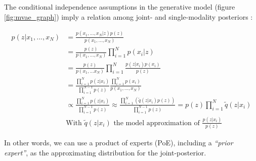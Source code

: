 \documentclass[12pt]{report}
\begin{document}
The conditional independence assumptions in the generative model (figure \ref{fig:mvae_graph}) imply a relation among joint- and single-modality posteriors :

\begin{equation}
    \begin{split}
        p(z|x_1, ..., x_N) & = \frac{p(x_1, ..., x_N | z) p(z)}{p(x_1, ..., x_N)} \\
        & = \frac{p(z)}{p(x_1, ..., x_N)} \prod_{i=1}^{N} p(x_i | z) \\
        & = \frac{p(z)}{p(x_1, ... x_N)} \prod_{i=1}^{N} \frac{p(z|x_i)p(x_i)}{p(z)} \\
        & = \frac{\prod_{i=1}^{N} p(z|x_i)}{\prod_{i=1}^{N-1} p(z)} \frac{\prod_{i=1}^{N}p(x_i)}{p(x_1, ..., x_N)} \\
        & \propto \frac{\prod_{i=1}^{N} p(z|x_i)}{\prod_{i=1}^{N-1} p(z)}
        \approx \frac{\prod_{i=1}^{N} (\widetilde{q}(z|x_i)p(z))}{\prod_{i=1}^{N-1} p(z)}
        = p(z) \prod_{i=1}^{N} \widetilde{q}(z | x_i) \\
        & \text{With $\widetilde{q}(z|x_i)$ the model approximation of $\frac{p(z|x_i)}{p(z)}$}
    \label{eq:poe}
    \end{split}
\end{equation}

In other words, we can use a product of experts (PoE), including a \textit{“prior expert”}, as the approximating distribution for the joint-posterior.
\end{document}
